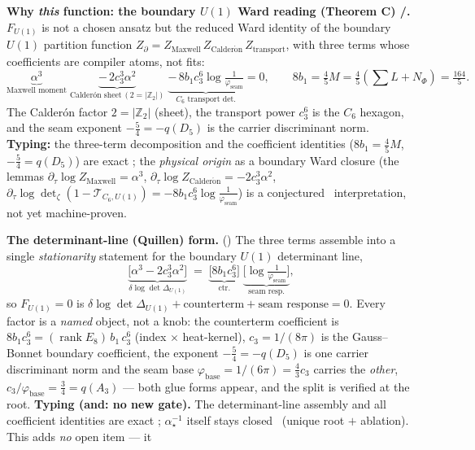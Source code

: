 \documentclass[11pt,a4paper]{article}
\newcommand{\cthree}{c_3}
\newcommand{\phibase}{\varphi_{\mathrm{base}}}
\newcommand{\phiseam}{\varphi_{\mathrm{seam}}}
\newcommand{\ainv}{\alpha^{-1}_\star}
\newcommand{\Z}{\mathbb{Z}}
\theoremstyle{definition}
\begin{document}
\par\smallskip\noindent\textbf{Why \emph{this} function: the boundary $U(1)$ Ward reading (Theorem C) \mE/\mC.}
$F_{U(1)}$ is not a chosen ansatz but the reduced Ward identity of the boundary $U(1)$ partition function
$Z_{\partial}=Z_{\mathrm{Maxwell}}\,Z_{\mathrm{Calder\acute on}}\,Z_{\mathrm{transport}}$, with three terms
whose coefficients are compiler atoms, not fits:
\[
  \underbrace{\alpha^3}_{\text{Maxwell moment}}\;
  \underbrace{-\,2\cthree^3\alpha^2}_{\text{Calder\'on sheet}\,(2=|\Z_2|)}\;
  \underbrace{-\,8b_1\cthree^6\log\tfrac1{\phiseam}}_{\text{$C_6$ transport det.}}=0,\qquad
  8b_1=\tfrac45 M=\tfrac45(\textstyle\sum L+N_\Phi)=\tfrac{164}{5}.
\]
The Calder\'on factor $2=|\Z_2|$ (sheet), the transport power $\cthree^6$ is the $C_6$ hexagon, and the
seam exponent $-\tfrac54=-q(D_5)$ is the carrier discriminant norm. \textbf{Typing:} the three-term
decomposition and the coefficient identities ($8b_1=\tfrac45 M$, $-\tfrac54=q(D_5)$) are exact \mE; the
\emph{physical origin} as a boundary Ward closure (the lemmas $\partial_\tau\log Z_{\mathrm{Maxwell}}=\alpha^3$,
$\partial_\tau\log Z_{\mathrm{Calder\acute on}}=-2\cthree^3\alpha^2$, $\partial_\tau\log\det\nolimits_\zeta(1-\mathcal T_{C_6,U(1)})=-8b_1\cthree^6\log\tfrac1{\phiseam}$)
is a conjectured \mC\ interpretation, not yet machine-proven. 
\par\smallskip
\noindent\textbf{The determinant-line (Quillen) form.} ()
The three terms assemble into a single \emph{stationarity} statement for the boundary $U(1)$ determinant line,
\[
  \underbrace{\bigl[\alpha^3-2\cthree^3\alpha^2\bigr]}_{\delta\log\det\Delta_{U(1)}}
  \;=\;\underbrace{\bigl[8b_1\cthree^6\bigr]}_{\text{ctr.}}\;
  \underbrace{\bigl[\log\tfrac1{\phiseam}\bigr]}_{\text{seam resp.}},
\]
so $F_{U(1)}=0$ is $\delta\log\det\Delta_{U(1)}+\text{counterterm}+\text{seam response}=0$. Every factor is a
\emph{named} object, not a knob: the counterterm coefficient is $8b_1\cthree^6=(\operatorname{rank}E_8)\,b_1\,\cthree^6$
(index $\times$ heat-kernel), $\cthree=1/(8\pi)$ is the Gauss--Bonnet boundary coefficient, the exponent
$-\tfrac54=-q(D_5)$ is one carrier discriminant norm and the seam base $\phibase=1/(6\pi)=\tfrac43\cthree$ carries
the \emph{other}, $\cthree/\phibase=\tfrac34=q(A_3)$ --- both glue forms appear, and the split is verified at the
root. \textbf{Typing (and: no new gate).} The determinant-line assembly and all coefficient identities are exact
\mE; $\ainv$ itself stays closed \mE\ (unique root $+$ ablation). This adds \emph{no} open item --- it
\end{document}

